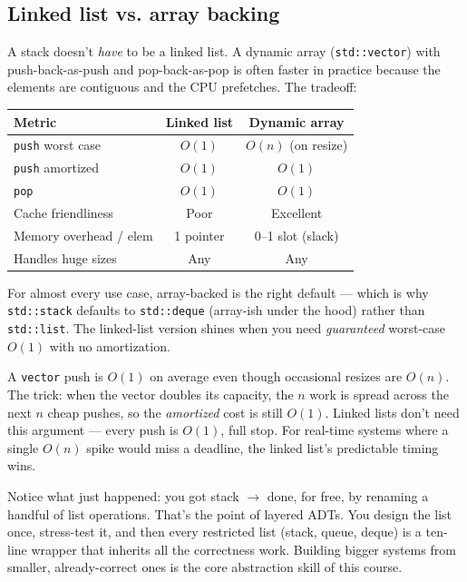 \documentclass[11pt]{article}
\begin{document}
\subsection*{Linked list vs. array backing}

A stack doesn't \emph{have} to be a linked list. A dynamic array
(\texttt{std::vector}) with push-back-as-push and pop-back-as-pop
is often faster in practice because the elements are contiguous
and the CPU prefetches. The tradeoff:

\begin{center}
\begin{tabular}{|l|c|c|}
\hline
\textbf{Metric} & \textbf{Linked list} & \textbf{Dynamic array} \\
\hline
\texttt{push} worst case  & $O(1)$        & $O(n)$ (on resize) \\
\texttt{push} amortized   & $O(1)$        & $O(1)$ \\
\texttt{pop}              & $O(1)$        & $O(1)$ \\
Cache friendliness        & Poor          & Excellent \\
Memory overhead / elem    & 1 pointer     & 0--1 slot (slack) \\
Handles huge sizes        & Any           & Any \\
\hline
\end{tabular}
\end{center}

For almost every use case, array-backed is the right default ---
which is why \texttt{std::stack} defaults to \texttt{std::deque}
(array-ish under the hood) rather than \texttt{std::list}. The
linked-list version shines when you need \emph{guaranteed}
worst-case $O(1)$ with no amortization.

\begin{notebox}
A \texttt{vector} push is $O(1)$ on average even though
occasional resizes are $O(n)$. The trick: when the vector doubles
its capacity, the $n$ work is spread across the next $n$ cheap
pushes, so the \emph{amortized} cost is still $O(1)$. Linked
lists don't need this argument --- every push is $O(1)$, full
stop. For real-time systems where a single $O(n)$ spike would
miss a deadline, the linked list's predictable timing wins.
\end{notebox}

\begin{ideabox}
Notice what just happened: you got stack $\to$ done, for free,
by renaming a handful of list operations. That's the point of
layered ADTs. You design the list once, stress-test it, and then
every restricted list (stack, queue, deque) is a ten-line wrapper
that inherits all the correctness work. Building bigger systems
from smaller, already-correct ones is the core abstraction skill
of this course.
\end{ideabox}
\end{document}
